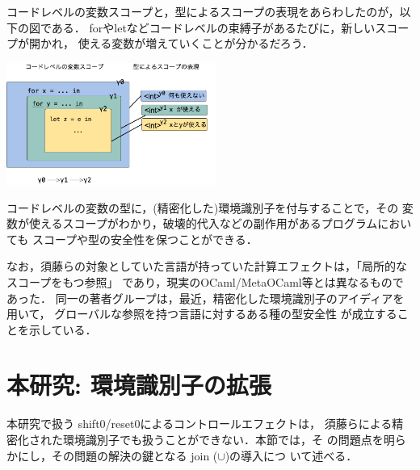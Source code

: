コードレベルの変数スコープと，型によるスコープの表現をあらわしたのが，以下の図である．
forやletなどコードレベルの束縛子があるたびに，新しいスコープが開かれ，
使える変数が増えていくことが分かるだろう．
\begin{center}
  \includegraphics[clip,height=4cm]{./img/ec_for.png}
\end{center}

コードレベルの変数の型に，(精密化した)環境識別子を付与することで，その
変数が使えるスコープがわかり，破壊的代入などの副作用があるプログラムにおいても
スコープや型の安全性を保つことができる．

なお，須藤らの対象としていた言語が持っていた計算エフェクトは，「局所的なスコープをもつ参照」
であり，現実のOCaml/MetaOCaml等とは異なるものであった．
同一の著者グループは，最近，精密化した環境識別子のアイディアを用いて，
グローバルな参照を持つ言語に対するある種の型安全性
が成立することを示している\cite{Aplas2016}．

\section{本研究: 環境識別子の拡張}

本研究で扱う shift0/reset0によるコントロールエフェクトは，
須藤らによる精密化された環境識別子でも扱うことができない．本節では，そ
の問題点を明らかにし，その問題の解決の鍵となる join ($\cup$)の導入につ
いて述べる．

